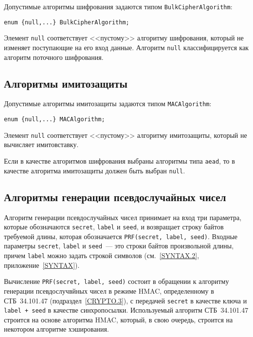 Допустимые алгоритмы шифрования задаются типом 
\lstinline{BulkCipherAlgorithm}: 
\begin{lstlisting}
enum {null,...} BulkCipherAlgorithm; 
\end{lstlisting}

Элемент \lstinline{null} соответствует <<пустому>> алгоритму шифрования, 
который не изменяет поступающие на его вход данные. Алгоритм 
\lstinline{null} классифицируется как алгоритм поточного шифрования. 

\subsection{Алгоритмы имитозащиты}\label{CRYPTO.2.2}

Допустимые алгоритмы имитозащиты задаются типом \lstinline{MACAlgorithm}: 
\begin{lstlisting}
enum {null,...} MACAlgorithm;
\end{lstlisting}

Элемент \lstinline{null} соответствует <<пустому>> алгоритму имитозащиты, 
который не вычисляет имитовставку. 

Если в качестве алгоритмов шифрования выбраны алгоритмы типа \lstinline{aead}, 
то в качестве алгоритма имитозащиты должен быть выбран \lstinline{null}. 

\subsection{Алгоритмы генерации псевдослучайных чисел}\label{CRYPTO.2.3}

Алгоритм генерации псевдослучайных чисел принимает на вход три параметра, 
которые обозначаются \lstinline{secret}, \lstinline{label} и \lstinline{seed}, и 
возвращает строку байтов требуемой длины, которая обозначается 
\lstinline{PRF(secret, label, seed)}. Входные параметры 
\lstinline{secret}, \lstinline{label} и \lstinline{seed}~--- это строки байтов 
произвольной длины, причем \lstinline{label} можно задать строкой символов 
(см.~\ref{SYNTAX.2}, приложение~\ref{SYNTAX}). 

Вычисление \lstinline{PRF(secret, label, seed)} состоит в обращении к 
алгоритму генерации псевдослучвйных чисел в режиме HMAC, определенному в 
СТБ~34.101.47 (подраздел~\ref{CRYPTO.3}), с передачей \lstinline{secret} в 
качестве ключа и \lstinline{label + seed} в качестве синхропосылки. 
Используемый алгоритм СТБ~34.101.47 строится на основе алгоритма HMAC, 
который, в свою очередь, строится на некотором алгоритме хэширования. 

